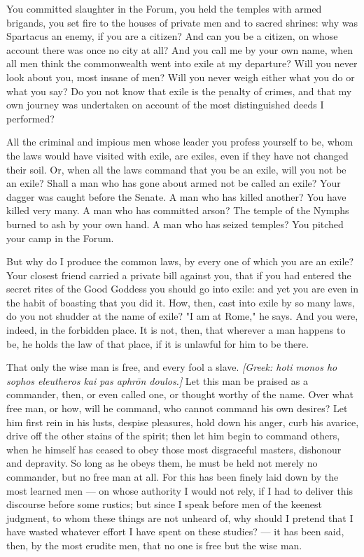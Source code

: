  You committed slaughter in the Forum, you held the temples with armed brigands, you set fire to the houses of private men and to sacred shrines: why was Spartacus an enemy, if you are a citizen? And can you be a citizen, on whose account there was once no city at all? And you call me by your own name, when all men think the commonwealth went into exile at my departure? Will you never look about you, most insane of men? Will you never weigh either what you do or what you say? Do you not know that exile is the penalty of crimes, and that my own journey was undertaken on account of the most distinguished deeds I performed?

 All the criminal and impious men whose leader you profess yourself to be, whom the laws would have visited with exile, are exiles, even if they have not changed their soil. Or, when all the laws command that you be an exile, will you not be an exile? Shall a man who has gone about armed not be called an exile? Your dagger was caught before the Senate. A man who has killed another? You have killed very many. A man who has committed arson? The temple of the Nymphs burned to ash by your own hand. A man who has seized temples? You pitched your camp in the Forum.

 But why do I produce the common laws, by every one of which you are an exile? Your closest friend carried a private bill against you, that if you had entered the secret rites of the Good Goddess you should go into exile: and yet you are even in the habit of boasting that you did it. How, then, cast into exile by so many laws, do you not shudder at the name of exile? "I am at Rome," he says. And you were, indeed, in the forbidden place. It is not, then, that wherever a man happens to be, he holds the law of that place, if it is unlawful for him to be there.

 That only the wise man is free, and every fool a slave. \textit{[Greek: hoti monos ho sophos eleutheros kai pas aphrōn doulos.]} Let this man be praised as a commander, then, or even called one, or thought worthy of the name. Over what free man, or how, will he command, who cannot command his own desires? Let him first rein in his lusts, despise pleasures, hold down his anger, curb his avarice, drive off the other stains of the spirit; then let him begin to command others, when he himself has ceased to obey those most disgraceful masters, dishonour and depravity. So long as he obeys them, he must be held not merely no commander, but no free man at all. For this has been finely laid down by the most learned men — on whose authority I would not rely, if I had to deliver this discourse before some rustics; but since I speak before men of the keenest judgment, to whom these things are not unheard of, why should I pretend that I have wasted whatever effort I have spent on these studies? — it has been said, then, by the most erudite men, that no one is free but the wise man.

